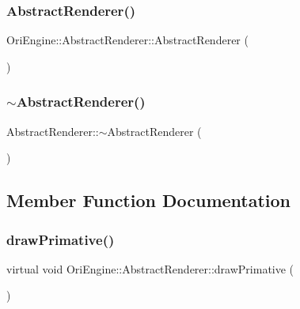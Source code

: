 \subsubsection{\texorpdfstring{Abstract\+Renderer()}{AbstractRenderer()}}
{\footnotesize\ttfamily Ori\+Engine\+::\+Abstract\+Renderer\+::\+Abstract\+Renderer (\begin{DoxyParamCaption}{ }\end{DoxyParamCaption})\hspace{0.3cm}{\ttfamily [inline]}}

\hypertarget{class_ori_engine_1_1_abstract_renderer_a7bdef22326c436a4152632180d98bc6e}{}\label{class_ori_engine_1_1_abstract_renderer_a7bdef22326c436a4152632180d98bc6e} 
\subsubsection{\texorpdfstring{$\sim$\+Abstract\+Renderer()}{~AbstractRenderer()}}
{\footnotesize\ttfamily Abstract\+Renderer\+::$\sim$\+Abstract\+Renderer (\begin{DoxyParamCaption}{ }\end{DoxyParamCaption})\hspace{0.3cm}{\ttfamily [virtual]}}



\subsection{Member Function Documentation}
\hypertarget{class_ori_engine_1_1_abstract_renderer_aece5371f0d8b99e6ee456845aba89f8d}{}\label{class_ori_engine_1_1_abstract_renderer_aece5371f0d8b99e6ee456845aba89f8d} 
\subsubsection{\texorpdfstring{draw\+Primative()}{drawPrimative()}}
{\footnotesize\ttfamily virtual void Ori\+Engine\+::\+Abstract\+Renderer\+::draw\+Primative (\begin{DoxyParamCaption}{ }\end{DoxyParamCaption})\hspace{0.3cm}{\ttfamily [pure virtual]}}



